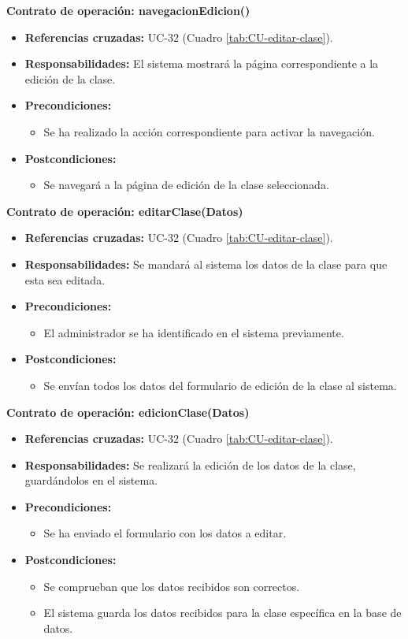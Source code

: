 \textbf{Contrato de operación: navegacionEdicion()}
\begin{itemize}
\item \textbf{Referencias cruzadas:} UC-32 (Cuadro \ref{tab:CU-editar-clase}).
\item \textbf{Responsabilidades:} El sistema mostrará la página correspondiente a la edición de la clase.
\item \textbf{Precondiciones:} 
 \begin{itemize}
\item Se ha realizado la acción correspondiente para activar la navegación.
\end {itemize}
\item \textbf{Postcondiciones:} 
 \begin{itemize}
\item Se navegará a la página de edición de la clase seleccionada.
\end {itemize}
\end {itemize}

\textbf{Contrato de operación: editarClase(Datos)}
\begin{itemize}
\item \textbf{Referencias cruzadas:} UC-32 (Cuadro \ref{tab:CU-editar-clase}).
\item \textbf{Responsabilidades:} Se mandará al sistema los datos de la clase para que esta sea editada.
\item \textbf{Precondiciones:} 
 \begin{itemize}
\item El administrador se ha identificado en el sistema previamente.
\end {itemize}
\item \textbf{Postcondiciones:} 
 \begin{itemize}
\item Se envían todos los datos del formulario de edición de la clase al sistema.
\end {itemize}
\end {itemize}

\textbf{Contrato de operación: edicionClase(Datos)}
\begin{itemize}
\item \textbf{Referencias cruzadas:} UC-32 (Cuadro \ref{tab:CU-editar-clase}).
\item \textbf{Responsabilidades:} Se realizará la edición de los datos de la clase, guardándolos en el sistema.
\item \textbf{Precondiciones:} 
 \begin{itemize}
\item Se ha enviado el formulario con los datos a editar.
\end {itemize}
\item \textbf{Postcondiciones:} 
 \begin{itemize}
 \item Se comprueban que los datos recibidos son correctos.
\item El sistema guarda los datos recibidos para la clase específica en la base de datos.
\end {itemize}
\end {itemize}

